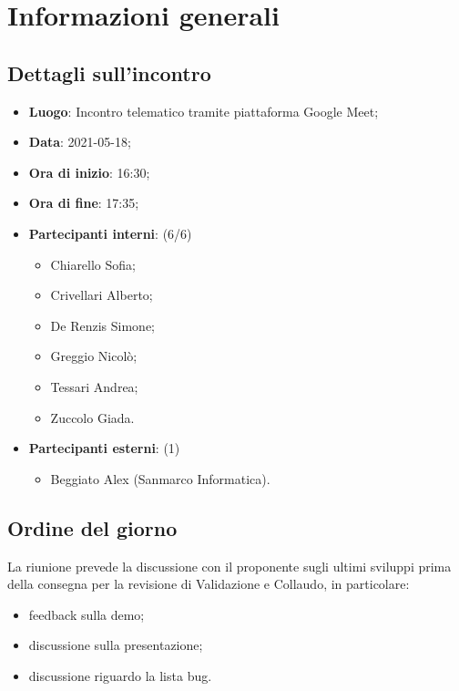 \section{Informazioni generali}

\subsection{Dettagli sull'incontro}
\begin{itemize}
\item \textbf{Luogo}: Incontro telematico tramite piattaforma Google Meet;
\item \textbf{Data}: 2021-05-18;
\item \textbf{Ora di inizio}: 16:30;
\item \textbf{Ora di fine}: 17:35;
\item \textbf{Partecipanti interni}: (6/6)
\begin{itemize}
	\item Chiarello Sofia;
	\item Crivellari Alberto;
	\item De Renzis Simone;
	\item Greggio Nicolò;
	\item Tessari Andrea;
	\item Zuccolo Giada.
\end{itemize}
\item \textbf{Partecipanti esterni}: (1)
\begin{itemize}
	\item Beggiato Alex (Sanmarco Informatica).
\end{itemize}
\end{itemize}

\subsection{Ordine del giorno}

La riunione prevede la discussione con il proponente sugli ultimi sviluppi prima della consegna per la revisione di Validazione e Collaudo, in particolare:
\begin{itemize}
    \item feedback sulla demo;
    \item discussione sulla presentazione;
    \item discussione riguardo la lista bug.
\end{itemize}




\texttt{}